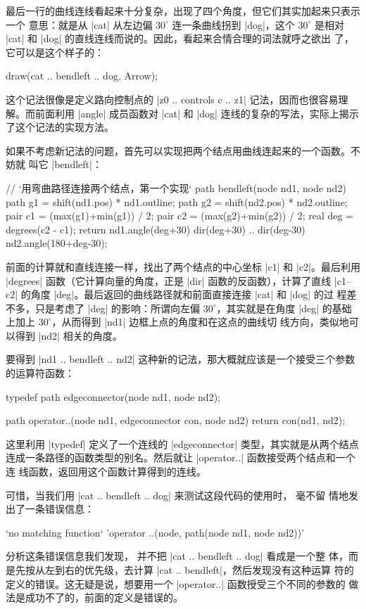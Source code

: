 最后一行的曲线连线看起来十分复杂，出现了四个角度，但它们其实加起来只表示一个
意思：就是从 |cat| 从左边偏 $30^\circ$ 连一条曲线拐到 |dog|，这个 $30^\circ$
是相对 |cat| 和 |dog| 的直线连线而说的。因此，看起来合情合理的词法就呼之欲出
了，它可以是这个样子的：
\begin{asycode}
draw(cat .. bendleft .. dog, Arrow);
\end{asycode}
这个记法很像是定义路向控制点的 |z0 .. controls c .. z1| 记法，因而也很容易理
解。而前面利用 |angle| 成员函数对 |cat| 和 |dog| 连线的复杂的写法，实际上揭示
了这个记法的实现方法。

如果不考虑新记法的问题，首先可以实现把两个结点用曲线连起来的一个函数。不妨就
叫它 |bendleft|：
\begin{asycode}
// `\color{comment}用弯曲路径连接两个结点，第一个实现`
path bendleft(node nd1, node nd2)
{
    path g1 = shift(nd1.pos) * nd1.outline;
    path g2 = shift(nd2.pos) * nd2.outline;
    pair c1 = (max(g1)+min(g1)) / 2;
    pair c2 = (max(g2)+min(g2)) / 2;
    real deg = degrees(c2 - c1);
    return nd1.angle(deg+30) {dir(deg+30)}
        .. {dir(deg-30)} nd2.angle(180+deg-30);
}
\end{asycode}
前面的计算就和直线连接一样，找出了两个结点的中心坐标 |c1| 和 |c2|。最后利用
|degrees| 函数（它计算向量的角度，正是 |dir| 函数的反函数），计算了直线
|c1--c2| 的角度 |deg|。最后返回的曲线路径就和前面直接连接 |cat| 和 |dog| 的过
程差不多，只是考虑了 |deg| 的影响：所谓向左偏 $30^\circ$，其实就是在角度
|deg| 的基础上加上 $30^\circ$，从而得到 |nd1| 边框上点的角度和在这点的曲线切
线方向，类似地可以得到 |nd2| 相关的角度。

要得到 |nd1 .. bendleft .. nd2| 这种新的记法，那大概就应该是一个接受三个参数
的运算符函数：
\begingroup
\renewcommand\thelstnumber{?}
\begin{asycode}[numbers=left]
typedef path edgeconnector(node nd1, node nd2);

path operator..(node nd1, edgeconnector con, node nd2)
{
    return con(nd1, nd2);
}
\end{asycode}
\endgroup
这里利用 |typedef| 定义了一个连线的 |edgeconnector| 类型，其实就是从两个结点
连成一条路径的函数类型的别名。然后就让 |operator..| 函数接受两个结点和一个连
线函数，返回用这个函数计算得到的连线。

可惜，当我们用 |cat .. bendleft .. dog| 来测试这段代码的使用时，\Asy{} 毫不留
情地发出了一条错误信息：
\begin{asycode}
`no matching function` 'operator ..(node, path(node nd1, node nd2))'
\end{asycode}
分析这条错误信息我们发现，\Asy{} 并不把 |cat .. bendleft .. dog| 看成是一个整
体，而是先按从左到右的优先级，去计算 |cat .. bendleft|，然后发现没有这种运算
符的定义的错误。这无疑是说，想要用一个 |operator..| 函数授受三个不同的参数的
做法是成功不了的，前面的定义是错误的。

